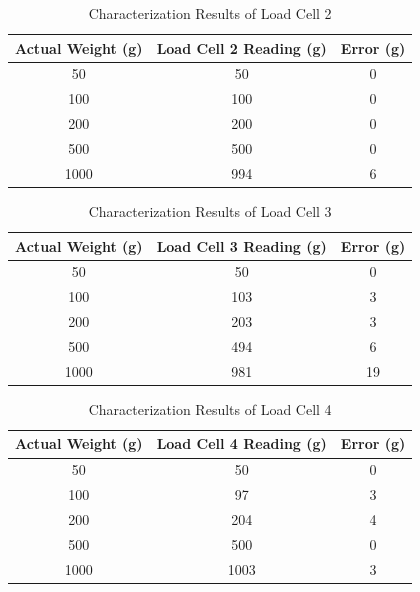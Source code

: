\begin{enumerate}[label=\Alph*.]
        \begin{table}[h!]
            \centering
            \caption{Characterization Results of Load Cell 2}
            \begin{tabular}{|c|c|c|}
                \hline
                \textbf{Actual Weight (g)} & \textbf{Load Cell 2 Reading (g)} & \textbf{Error (g)} \\
                \hline
                50        & 50        & 0   \\
                100       & 100       & 0   \\
                200       & 200       & 0   \\
                500       & 500       & 0   \\
                1000      & 994       & 6   \\           
                \hline
        \end{tabular}
        \label{tab:Calibration_Load_Cell_2}
        \end{table}

        \begin{table}[h!]
            \centering
            \caption{Characterization Results of Load Cell 3}
            \begin{tabular}{|c|c|c|}
                \hline
                \textbf{Actual Weight (g)} & \textbf{Load Cell 3 Reading (g)} & \textbf{Error (g)} \\
                \hline
                50        & 50        & 0    \\    
                100       & 103       & 3    \\    
                200       & 203       & 3    \\    
                500       & 494       & 6    \\    
                1000      & 981       & 19   \\               
                \hline
        \end{tabular}
        \label{tab:Calibration_Load_Cell_3}
        \end{table}

        \begin{table}[h!]
            \centering
            \caption{Characterization Results of Load Cell 4}
            \begin{tabular}{|c|c|c|}
                \hline
                \textbf{Actual Weight (g)} & \textbf{Load Cell 4 Reading (g)} & \textbf{Error (g)} \\
                \hline
                50        & 50        & 0   \\     
                100       & 97        & 3   \\     
                200       & 204       & 4   \\     
                500       & 500       & 0   \\     
                1000      & 1003      & 3   \\                
                \hline
        \end{tabular}
        \label{tab:Calibration_Load_Cell_4}
        \end{table}
    

\end{enumerate}

